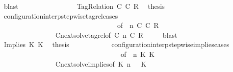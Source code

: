 \begin{isabellebody}
\ blast\isanewline
\ \ \ \ \ \ \isamarkupfalse%
\isanewline
\ \ \ \ \ \ \ \ \isamarkupfalse%
\ {\isacharparenleft}TagRelation\ C\ C\ R{\isacharparenright}\ \isamarkupfalse%
\ {\isacharquery}thesis\isanewline
\ \ \ \ \ \ \ \ \ \ \isamarkupfalse%
\ configuration{\isacharunderscore}interp{\isacharunderscore}stepwise{\isacharunderscore}tagrel{\isacharunderscore}cases\isanewline
\ \ \ \ \ \ \ \ \ \ \ \ \ \ \ \ \ \ \ \ \ \ \ \ \ \ \ \ \ \ \ \ \ \ {\isacharbrackleft}of\ {\isacartoucheopen}{\isasymGamma}{\isacartoucheclose}\ {\isacartoucheopen}n{\isacartoucheclose}\ {\isacartoucheopen}C\ {\isacartoucheopen}C\ {\isacartoucheopen}R{\isacartoucheclose}\ {\isacartoucheopen}{\isasymPsi}{\isacartoucheclose}\ {\isacartoucheopen}{\isasymPhi}{\isacartoucheclose}{\isacharbrackright}\isanewline
\ \ \ \ \ \ \ \ \ \ \ \ \ \ \ \ Cnext{\isacharunderscore}solve{\isacharunderscore}tagrel{\isacharbrackleft}of\ {\isacartoucheopen}C\ {\isacartoucheopen}n{\isacartoucheclose}\ {\isacartoucheopen}C\ {\isacartoucheopen}R{\isacartoucheclose}\ {\isacartoucheopen}{\isasymGamma}{\isacartoucheclose}\ {\isacartoucheopen}{\isasymPsi}{\isacartoucheclose}\ {\isacartoucheopen}{\isasymPhi}{\isacartoucheclose}{\isacharbrackright}\ \isamarkupfalse%
\ blast\isanewline
\ \ \ \ \ \ \isamarkupfalse%
\isanewline
\ \ \ \ \ \ \ \ \isamarkupfalse%
\ {\isacharparenleft}Implies\ K{}\ K{}{\isacharparenright}\ \isamarkupfalse%
\ {\isacharquery}thesis\isanewline
\ \ \ \ \ \ \ \ \ \ \isamarkupfalse%
\ configuration{\isacharunderscore}interp{\isacharunderscore}stepwise{\isacharunderscore}implies{\isacharunderscore}cases\isanewline
\ \ \ \ \ \ \ \ \ \ \ \ \ \ \ \ \ \ \ \ \ \ \ \ \ \ \ \ \ \ \ \ \ \ \ {\isacharbrackleft}of\ {\isacartoucheopen}{\isasymGamma}{\isacartoucheclose}\ {\isacartoucheopen}n{\isacartoucheclose}\ {\isacartoucheopen}K{}{\isacartoucheclose}\ {\isacartoucheopen}K{}{\isacartoucheclose}\ {\isacartoucheopen}{\isasymPsi}{\isacartoucheclose}\ {\isacartoucheopen}{\isasymPhi}{\isacartoucheclose}{\isacharbrackright}\isanewline
\ \ \ \ \ \ \ \ \ \ \ \ \ \ \ \ Cnext{\isacharunderscore}solve{\isacharunderscore}implies{\isacharbrackleft}of\ {\isacartoucheopen}K{}{\isacartoucheclose}\ {\isacartoucheopen}n{\isacartoucheclose}\ {\isacartoucheopen}{\isasymGamma}{\isacartoucheclose}\ {\isacartoucheopen}{\isasymPsi}{\isacartoucheclose}\ {\isacartoucheopen}K{}{\isacartoucheclose}\ {\isacartoucheopen}{\isasymPhi}{\isacartoucheclose}{\isacharbrackright}\ \isamarkupfalse%

\end{isabellebody}
